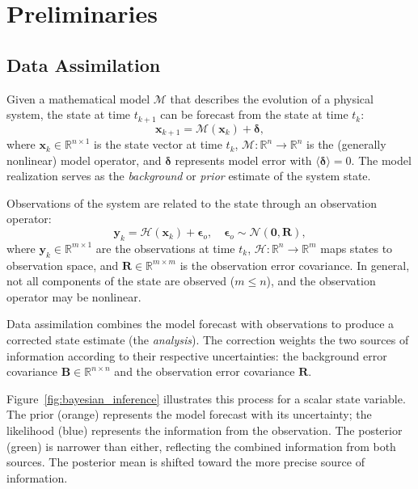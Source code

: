 \chapter{Preliminaries}
\label{ch:preliminaries}

\section{Data Assimilation}
\label{sec:da}

Given a mathematical model $\mathcal{M}$ that describes the evolution of a physical system, the state at time $t_{k+1}$ can be forecast from the state at time $t_k$:
\begin{equation}
\label{eq:model}
\mathbf{x}_{k+1} = \mathcal{M}(\mathbf{x}_k) + \boldsymbol{\delta},
\end{equation}
where $\mathbf{x}_k \in \mathbb{R}^{n \times 1}$ is the state vector at time $t_k$, $\mathcal{M}: \mathbb{R}^n \to \mathbb{R}^n$ is the (generally nonlinear) model operator, and $\boldsymbol{\delta}$ represents model error with $\langle \boldsymbol{\delta} \rangle = 0$. The model realization serves as the \emph{background} or \emph{prior} estimate of the system state.

Observations of the system are related to the state through an observation operator:
\begin{equation}
\label{eq:observation}
\mathbf{y}_k = \mathcal{H}(\mathbf{x}_k) + \boldsymbol{\epsilon}_o, \quad \boldsymbol{\epsilon}_o \sim \mathcal{N}(\mathbf{0}, \mathbf{R}),
\end{equation}
where $\mathbf{y}_k \in \mathbb{R}^{m \times 1}$ are the observations at time $t_k$, $\mathcal{H}: \mathbb{R}^n \to \mathbb{R}^m$ maps states to observation space, and $\mathbf{R} \in \mathbb{R}^{m \times m}$ is the observation error covariance. In general, not all components of the state are observed ($m \leq n$), and the observation operator may be nonlinear.

Data assimilation combines the model forecast with observations to produce a corrected state estimate (the \emph{analysis}). The correction weights the two sources of information according to their respective uncertainties: the background error covariance $\mathbf{B} \in \mathbb{R}^{n \times n}$ and the observation error covariance $\mathbf{R}$.

Figure~\ref{fig:bayesian_inference} illustrates this process for a scalar state variable. The prior (orange) represents the model forecast with its uncertainty; the likelihood (blue) represents the information from the observation. The posterior (green) is narrower than either, reflecting the combined information from both sources. The posterior mean is shifted toward the more precise source of information.


